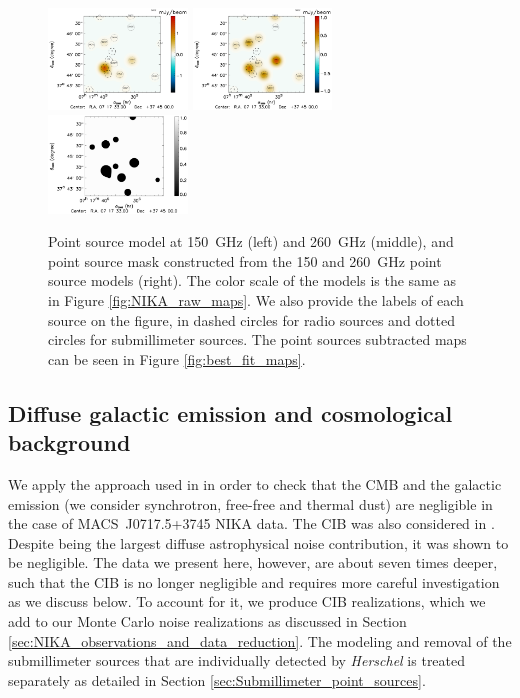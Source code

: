 \documentclass[twocolumn,traditabstract]{aa}
\begin{document}
\begin{figure}[h]
\centering
\includegraphics[width=0.33\textwidth]{Figure/PSexp_ps_2mm.pdf}
\includegraphics[width=0.33\textwidth]{Figure/PSexp_ps_1mm.pdf}
\includegraphics[width=0.33\textwidth]{Figure/PSexp_mask.pdf}
\caption{\footnotesize{Point source model at 150~GHz (left) and 260~GHz (middle), and point source mask constructed from the 150 and 260~GHz point source models (right). The color scale of the models is the same as in Figure  \ref{fig:NIKA_raw_maps}. We also provide the labels of each source on the figure, in dashed circles for radio sources and dotted circles for submillimeter sources. The point sources subtracted maps can be seen in Figure  \ref{fig:best_fit_maps}.}}
\label{fig:point_source_modeling}
\end{figure}

\subsection{Diffuse galactic emission and cosmological background}\label{sec:Diffuse_galactic_emission_and_cosmological_background}
We apply the approach used in \cite{Adam2016} in order to check that the CMB and the galactic emission (we consider synchrotron, free-free and thermal dust) are negligible in the case of \mbox{MACS~J0717.5+3745} NIKA data. The CIB was also considered in \cite{Adam2016}. Despite being the largest diffuse astrophysical noise contribution, it was shown to be negligible. The data we present here, however, are about seven times deeper, such that the CIB is no longer negligible and requires more careful investigation as we discuss below. To account for it, we produce CIB realizations, which we add to our Monte Carlo noise realizations as discussed in Section \ref{sec:NIKA_observations_and_data_reduction}. The modeling and removal of the submillimeter sources that are individually detected by \textit{Herschel} is treated separately as detailed in Section \ref{sec:Submillimeter_point_sources}.
\end{document}
